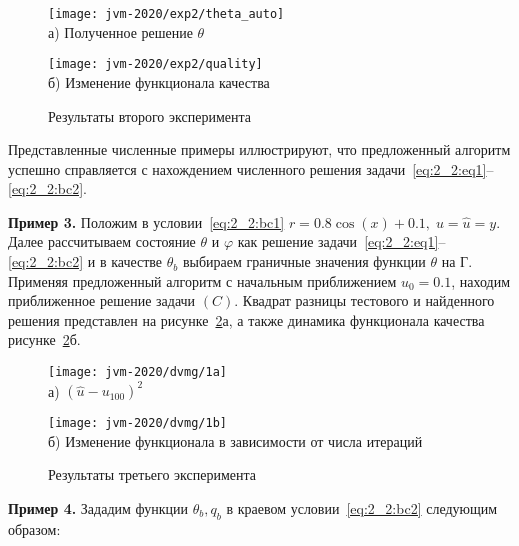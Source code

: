 \begin{figure}[ht]
    \begin{minipage}[b][][b]{0.49\linewidth}
        \centering
        \texttt{[image: jvm-2020/exp2/theta\_auto]}
        \\ а) Полученное решение $\theta$
    \end{minipage}
    \hfill
    \begin{minipage}[b][][b]{0.49\linewidth}
        \centering
        \texttt{[image: jvm-2020/exp2/quality]}
        \\ б) Изменение функционала качества
    \end{minipage}
    \caption{Результаты второго эксперимента}
    \label{fig:4_4:1}
\end{figure}

Представленные численные примеры иллюстрируют, что предложенный алгоритм успешно справляется
с нахождением численного решения задачи~\eqref{eq:2_2:eq1}--\eqref{eq:2_2:bc2}.


\textbf{Пример 3.}
Положим в условии~\eqref{eq:2_2:bc1}
$r=0.8 \cos (x)+0.1,\; u=\hat{u}=y$.
Далее рассчитываем состояние $\theta$ и $\varphi$ как решение
задачи~\eqref{eq:2_2:eq1}--\eqref{eq:2_2:bc2}
и в качестве $\theta_{b}$ выбираем граничные значения функции $\theta$ на Г.
Применяя предложенный алгоритм с начальным приближением $u_{0}=0.1$,
находим приближенное решение задачи $(C)$.
Квадрат разницы тестового и найденного решения представлен на рисунке~\ref{fig:4_4:2}а,
а также динамика функционала качества рисунке~\ref{fig:4_4:2}б.

\begin{figure}[ht]
    \begin{minipage}[b][][b]{0.49\linewidth}
        \centering
        \texttt{[image: jvm-2020/dvmg/1a]}
        \\ а) $\left(\hat{u}-u_{100}\right)^{2}$
    \end{minipage}
    \hfill
    \begin{minipage}[b][][b]{0.49\linewidth}
        \centering
        \texttt{[image: jvm-2020/dvmg/1b]}
        \\ б) Изменение функционала в зависимости от числа итераций
    \end{minipage}
    \caption{Результаты третьего эксперимента}
    \label{fig:4_4:2}
\end{figure}


\textbf{Пример 4.}
Зададим функции $\theta_{b}, q_{b}$ в краевом условии~\eqref{eq:2_2:bc2}
следующим образом:

